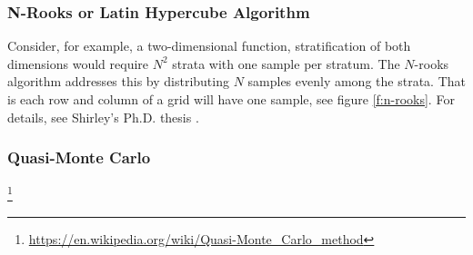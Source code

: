 \subsubsection{N-Rooks or Latin Hypercube Algorithm}
Consider, for example, a two-dimensional function, stratification of both dimensions would require $N^2$ strata with one sample per stratum. The $N$-rooks algorithm addresses this by distributing $N$ samples evenly among the strata. That is each row and column of a grid will have one sample, see figure \ref{f:n-rooks}. For details, see Shirley's Ph.D. thesis \cite[-5mm]{a:PhysicallyBasedLightingCalculationsForComputerGraphics}. 


\subsubsection{Quasi-Monte Carlo}\label{sec:quasi-monte-carlo}

\footnote{\url{https://en.wikipedia.org/wiki/Quasi-Monte_Carlo_method}}





